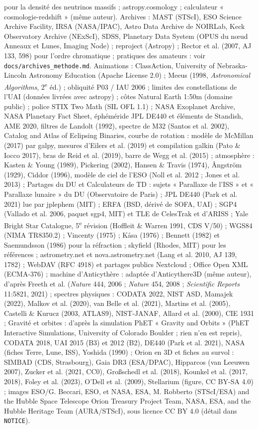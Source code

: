 pour la densité des neutrinos massifs ; astropy.cosmology ; calculateur « cosmologie-redshift » (même auteur). Archives : MAST (STScI), ESO Science Archive Facility, IRSA (NASA/IPAC), Astro Data Archive de NOIRLab, Keck Observatory Archive (NExScI), SDSS, Planetary Data System (OPUS du nœud Anneaux et Lunes, Imaging Node) ; reproject (Astropy) ; Rector et al. (2007, AJ 133, 598) pour l'ordre chromatique ; pratiques des amateurs : voir \texttt{docs/archives\_methode.md}. Animations : ClassAction, University of Nebraska-Lincoln Astronomy Education (Apache License 2.0) ; Meeus (1998, \emph{Astronomical Algorithms}, 2\textsuperscript{e} éd.) ; obliquité P03 / IAU 2006 ; limites des constellations de l'UAI (données livrées avec astropy) ; côtes Natural Earth 1:50m (domaine public) ; police STIX Two Math (SIL OFL 1.1) ; NASA Exoplanet Archive, NASA Planetary Fact Sheet, éphéméride JPL DE440 et éléments de Standish, AME 2020, filtres de Landolt (1992), spectre de M32 (Santos et al. 2002), Catalog and Atlas of Eclipsing Binaries, courbe de rotation : modèle de McMillan (2017) par galpy, mesures d'Eilers et al. (2019) et compilation galkin (Pato \& Iocco 2017), bras de Reid et al. (2019), barre de Wegg et al. (2015) ; atmosphère : Kasten \& Young (1989), Pickering (2002), Hansen \& Travis (1974), Ångström (1929), Ciddor (1996), modèle de ciel de l'ESO (Noll et al. 2012 ; Jones et al. 2013) ; Partages du DU et Calculateurs de TD : sujets « Parallaxe de l'ISS » et « Parallaxe lunaire » du DU (Observatoire de Paris) ; JPL DE440 (Park et al. 2021) lue par jplephem (MIT) ; ERFA (BSD, dérivé de SOFA, UAI) ; SGP4 (Vallado et al. 2006, paquet sgp4, MIT) et TLE de CelesTrak et d'ARISS ; Yale Bright Star Catalogue, 5\textsuperscript{e} révision (Hoffleit \& Warren 1991, CDS V/50) ; WGS84 (NIMA TR8350.2) ; Vincenty (1975) ; Kåsa (1976) ; Bennett (1982) et Saemundsson (1986) pour la réfraction ; skyfield (Rhodes, MIT) pour les références ; astrometry.net et nova.astrometry.net (Lang et al. 2010, AJ 139, 1782) ; WebDAV (RFC 4918) et partages publics Nextcloud ; Office Open XML (ECMA-376) ; machine d'Anticythère : adaptée d'Anticythere3D (même auteur), d'après Freeth et al. (\emph{Nature} 444, 2006 ; \emph{Nature} 454, 2008 ; \emph{Scientific Reports} 11:5821, 2021) ; spectres physiques : CODATA 2022, NIST ASD, Mamajek (2022), Malkov et al. (2020), van Belle et al. (2021), Martins et al. (2005), Castelli \& Kurucz (2003, ATLAS9), NIST-JANAF, Allard et al. (2000), CIE 1931 ; Gravité et orbites : d'après la simulation PhET « Gravity and Orbits » (PhET Interactive Simulations, University of Colorado Boulder ; rien n'en est repris), CODATA 2018, UAI 2015 (B3) et 2012 (B2), DE440 (Park et al. 2021), NASA (fiches Terre, Lune, ISS), Yoshida (1990) ; Orion en 3D et fiches au survol : SIMBAD (CDS, Strasbourg), Gaia DR3 (ESA/DPAC), Hipparcos (van Leeuwen 2007), Zucker et al. (2021, CC0), Großschedl et al. (2018), Kounkel et al. (2017, 2018), Foley et al. (2023), O'Dell et al. (2009), Stellarium (figure, CC BY-SA 4.0) ; images ESO/G. Beccari, ESO, et NASA, ESA, M. Robberto (STScI/ESA) and the Hubble Space Telescope Orion Treasury Project Team, NASA, ESA, and the Hubble Heritage Team (AURA/STScI), sous licence CC BY 4.0 (détail dans \texttt{NOTICE}).

